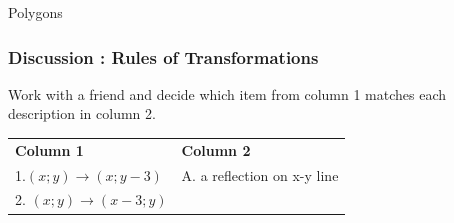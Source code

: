 \begin{exercises}{Polygons}
\begin{figure}[H]
 \end{figure}   

    \addtocounter{footnote}{-0}
    
          \par 
\label{m39358*secfhsst!!!underscore!!!id2730}
            \subsubsection{  Discussion : Rules of Transformations }
            \nopagebreak
            
          \label{m39358*id72588}Work with a friend and decide which item from column 1 matches each description in column 2.\par 
          
    
          \begin{table}[H]
        
    
        \begin{center}
      
      \label{m39358*id72595}
      
      \begin{xtabular}[t]{|l|l|}\hline
    
    
        
                    \textbf{Column 1}
                   &
    
    
        
                    \textbf{Column 2}
     \tabularnewline{}
    
    
        1.$\left(x;y\right)\to \left(x;y-3\right)$        &
    
    
        A. a reflection on x-y line%
     \tabularnewline{}
    
    
        2.
                    $\left(x;y\right)\to \left(x-3;y\right)$
                   &
    

\end{xtabular}
\end{center}
\end{table}
\end{exercises}
